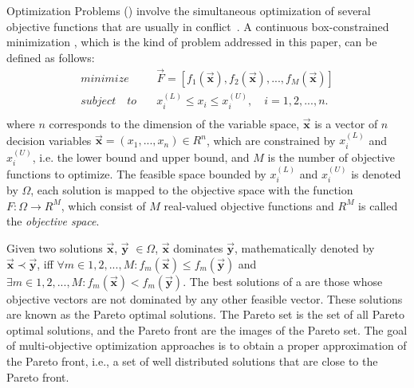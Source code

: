  Optimization Problems (\MOPS{}) %
%
involve the simultaneous optimization of several objective functions that are usually in conflict~\cite{Joel:Kalyanmoy}. 
%
A continuous box-constrained minimization \MOP{}, which is the kind of problem addressed in this paper, can be defined as follows:
\begin{equation}
   \begin{split}
    minimize \quad & \vec{F} = [f_1(\vec{\mathbf{x}}), f_2(\vec{\mathbf{x}}), ..., f_M(\vec{\mathbf{x}})] \\
   subject \quad to \quad &  x_i^{(L)} \leq x_i \leq x_i^{(U)}, \quad i=1,2,..., n. \\
   \end{split}
\end{equation}
where $n$ corresponds to the dimension of the variable space, $\vec{\mathbf{x}}$ is a vector of $n$ 
decision variables $\vec{\mathbf{x}}=(x_1, ..., x_n) \in R^n$, which are constrained by $x_i^{(L)}$ 
and $x_i^{(U)}$, i.e. the lower bound and upper bound, and $M$ is the number of objective functions
to optimize.
%
The feasible space bounded by $x_i^{(L)}$ and $x_i^{(U)}$ is denoted by $\Omega$, 
each solution is mapped to the objective space with the function $F : \Omega \rightarrow R^M$, 
which consist of $M$ real-valued objective functions and $R^M$ is called the \textit{objective space}. 

Given two solutions $\vec{\mathbf{x}}$, $\vec{\mathbf{y}}$ $\in \Omega$, $\vec{\mathbf{x}}$ dominates $\vec{\mathbf{y}}$, 
mathematically denoted by $\vec{\mathbf{x}} \prec \vec{\mathbf{y}}$, iff $\forall m \in {1,2,...,M} : 
f_m(\vec{\mathbf{x}}) \leq f_m(\vec{\mathbf{y}})$ and $\exists  m \in {1,2,...,M} : f_m(\vec{\mathbf{x}}) < f_m(\vec{\mathbf{y}})$.
%
The best solutions of a \MOP{} are those whose objective vectors are not dominated by any other feasible vector.
%
These solutions are known as the Pareto optimal solutions.
%
The Pareto set is the set of all Pareto optimal solutions, and the Pareto front are the images of the Pareto set. 
%
The goal of multi-objective optimization approaches is to obtain a proper approximation of the Pareto front, i.e., 
a set of well distributed solutions that are close to the Pareto front.

